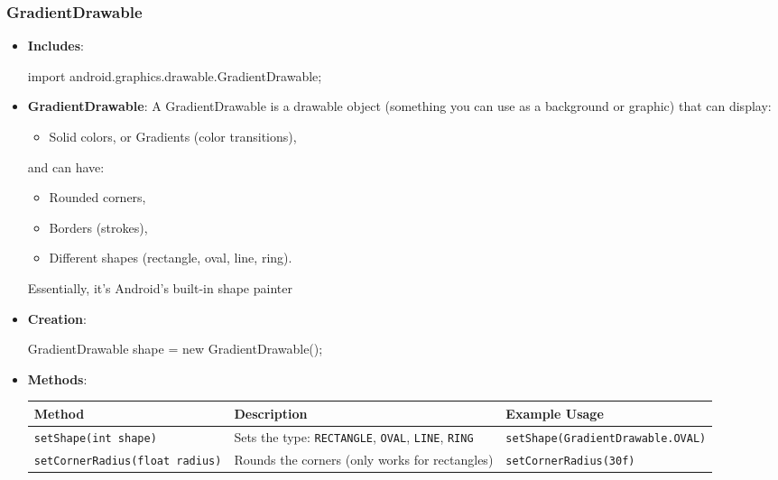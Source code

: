 \documentclass{report}
\begin{document}
    \subsubsection{GradientDrawable}
    \begin{itemize}
        \item \textbf{Includes}:
            \bigbreak \noindent 
            \begin{javacode}
                import android.graphics.drawable.GradientDrawable;
            \end{javacode}
        \item \textbf{GradientDrawable}: A GradientDrawable is a drawable object (something you can use as a background or graphic) that can display:
            \begin{itemize}
                \item Solid colors, or Gradients (color transitions),
            \end{itemize}
            and can have:
            \begin{itemize}
                \item Rounded corners,
                \item Borders (strokes),
                \item Different shapes (rectangle, oval, line, ring).
            \end{itemize}
            Essentially, it’s Android’s built-in shape painter
        \item \textbf{Creation}:
            \bigbreak \noindent 
            \begin{javacode}
            GradientDrawable shape = new GradientDrawable();
            \end{javacode}
        \item \textbf{Methods}:
            \begin{center}
                \begin{tabular}{p{4cm}|p{4cm}|p{4cm}}
                    \hline
                    \textbf{Method} & \textbf{Description} & \textbf{Example Usage} \\
                    \hline
                    \texttt{setShape(int shape)} & Sets the type: \texttt{RECTANGLE}, \texttt{OVAL}, \texttt{LINE}, \texttt{RING} & \texttt{setShape(GradientDrawable.OVAL)} \\
                    \hline
                    \texttt{setCornerRadius(float radius)} & Rounds the corners (only works for rectangles) & \texttt{setCornerRadius(30f)} \\

\end{tabular}
\end{center}
\end{itemize}
\end{document}
